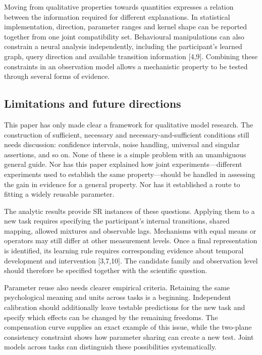 \documentclass[11pt,a4paper]{article}
\begin{document}
Moving from qualitative properties towards quantities expresses a
relation between the information required for different explanations. In
statistical implementation, direction, parameter ranges and kernel shape
can be reported together from one joint compatibility set. Behavioural
manipulations can also constrain a neural analysis independently,
including the participant's learned graph, query direction and available
transition information {[}4,9{]}. Combining these constraints in an
observation model allows a mechanistic property to be tested through
several forms of evidence.

\subsection{Limitations and future
directions}\label{limitations-and-future-directions}

This paper has only made clear a framework for qualitative model
research. The construction of sufficient, necessary and
necessary-and-sufficient conditions still needs discussion: confidence
intervals, noise handling, universal and singular assertions, and so on.
None of these is a simple problem with an unambiguous general guide. Nor
has this paper explained how joint experiments—different experiments
used to establish the same property—should be handled in assessing the
gain in evidence for a general property. Nor has it established a route
to fitting a widely reusable parameter.

The analytic results provide SR instances of these questions. Applying
them to a new task requires specifying the participant's internal
transitions, shared mapping, allowed mixtures and observable lags.
Mechanisms with equal means or operators may still differ at other
measurement levels. Once a final representation is identified, its
learning rule requires corresponding evidence about temporal development
and intervention {[}3,7,10{]}. The candidate family and observation
level should therefore be specified together with the scientific
question.

Parameter reuse also needs clearer empirical criteria. Retaining the
same psychological meaning and units across tasks is a beginning.
Independent calibration should additionally leave testable predictions
for the new task and specify which effects can be changed by the
remaining freedoms. The compensation curve supplies an exact example of
this issue, while the two-plane consistency constraint shows how
parameter sharing can create a new test. Joint models across tasks can
distinguish these possibilities systematically.
\end{document}

